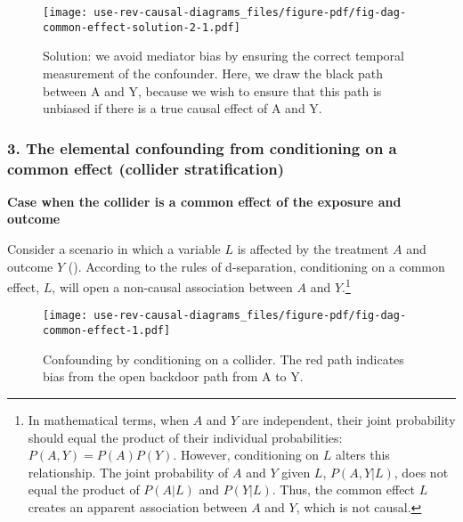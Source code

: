\documentclass[
  singlecolumn,
  9pt]{article}
\begin{document}
\begin{figure}

{\centering \texttt{[image: use-rev-causal-diagrams\_files/figure-pdf/fig-dag-common-effect-solution-2-1.pdf]}

}

\caption{\label{fig-dag-common-effect-solution-2}Solution: we avoid
mediator bias by ensuring the correct temporal measurement of the
confounder. Here, we draw the black path between A and Y, because we
wish to ensure that this path is unbiased if there is a true causal
effect of A and Y.}

\end{figure}

\subsubsection{3. The elemental confounding from conditioning on a
common effect (collider
stratification)}\label{the-elemental-confounding-from-conditioning-on-a-common-effect-collider-stratification}

\textbf{Case when the collider is a common effect of the exposure and
outcome}

Consider a scenario in which a variable \(L\) is affected by the
treatment \(A\) and outcome \(Y\) (). According to the rules of d-separation, conditioning on a
common effect, \(L\), will open a non-causal association between \(A\)
and \(Y\).\footnote{In mathematical terms, when \(A\) and \(Y\) are
  independent, their joint probability should equal the product of their
  individual probabilities: \(P(A, Y) = P(A)P(Y)\). However,
  conditioning on \(L\) alters this relationship. The joint probability
  of \(A\) and \(Y\) given \(L\), \(P(A, Y | L)\), does not equal the
  product of \(P(A | L)\) and \(P(Y | L)\). Thus, the common effect
  \(L\) creates an apparent association between \(A\) and \(Y\), which
  is not causal.}

\begin{figure}

{\centering \texttt{[image: use-rev-causal-diagrams\_files/figure-pdf/fig-dag-common-effect-1.pdf]}

}

\caption{\label{fig-dag-common-effect}Confounding by conditioning on a
collider. The red path indicates bias from the open backdoor path from A
to Y.}

\end{figure}
\end{document}
